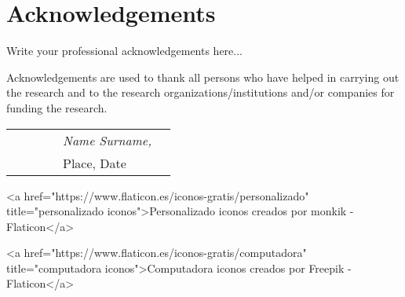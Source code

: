 \section*{Acknowledgements}

Write your professional acknowledgements here... 

Acknowledgements are used to thank all persons who have helped in carrying out the research and to the research organizations/institutions and/or companies for funding the research. 

\begin{table}[hb]
\begin{tabular}{lp{6.67cm}llll}
& & & & \textit{Name Surname,} \\
& & & & Place, Date
\end{tabular}
\end{table}



<a href="https://www.flaticon.es/iconos-gratis/personalizado" title="personalizado iconos">Personalizado iconos creados por monkik - Flaticon</a>

<a href="https://www.flaticon.es/iconos-gratis/computadora" title="computadora iconos">Computadora iconos creados por Freepik - Flaticon</a>